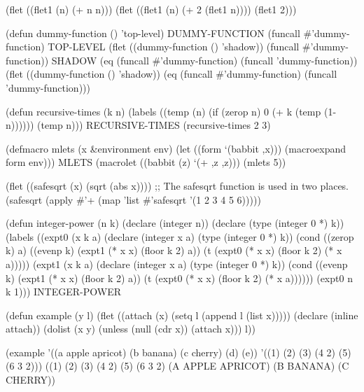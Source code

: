 {}

\code
 (flet ((flet1 (n) (+ n n)))
    (flet ((flet1 (n) (+ 2 (flet1 n))))
      (flet1 2))) 

 (defun dummy-function () 'top-level) \EV DUMMY-FUNCTION 
 (funcall #'dummy-function) \EV TOP-LEVEL 
 (flet ((dummy-function () 'shadow)) 
      (funcall #'dummy-function)) \EV SHADOW 
 (eq (funcall #'dummy-function) (funcall 'dummy-function))
\EV {} 
 (flet ((dummy-function () 'shadow))
   (eq (funcall #'dummy-function)
       (funcall 'dummy-function)))
\EV {} 

 (defun recursive-times (k n)
   (labels ((temp (n) 
              (if (zerop n) 0 (+ k (temp (1- n))))))
     (temp n))) \EV RECURSIVE-TIMES
 (recursive-times 2 3) 

 (defmacro mlets (x &environment env) 
    (let ((form `(babbit ,x)))
      (macroexpand form env))) \EV MLETS
 (macrolet ((babbit (z) `(+ ,z ,z))) (mlets 5)) 
\endcode

\code
 (flet ((safesqrt (x) (sqrt (abs x))))
  ;; The safesqrt function is used in two places.
   (safesqrt (apply #'+ (map 'list #'safesqrt '(1 2 3 4 5 6)))))
\endcode

\code
 (defun integer-power (n k)     
   (declare (integer n))         
   (declare (type (integer 0 *) k))
   (labels ((expt0 (x k a)
              (declare (integer x a) (type (integer 0 *) k))
              (cond ((zerop k) a)
                    ((evenp k) (expt1 (* x x) (floor k 2) a))
                    (t (expt0 (* x x) (floor k 2) (* x a)))))
            (expt1 (x k a)
              (declare (integer x a) (type (integer 0 *) k))
              (cond ((evenp k) (expt1 (* x x) (floor k 2) a))
                    (t (expt0 (* x x) (floor k 2) (* x a))))))
    (expt0 n k 1))) \EV INTEGER-POWER
\endcode

\code
 (defun example (y l)
   (flet ((attach (x)
            (setq l (append l (list x)))))
     (declare (inline attach))
     (dolist (x y)
       (unless (null (cdr x))
         (attach x)))
     l))

 (example '((a apple apricot) (b banana) (c cherry) (d) (e))
          '((1) (2) (3) (4 2) (5) (6 3 2)))
\EV ((1) (2) (3) (4 2) (5) (6 3 2) (A APPLE APRICOT) (B BANANA) (C CHERRY))
\endcode
{}

